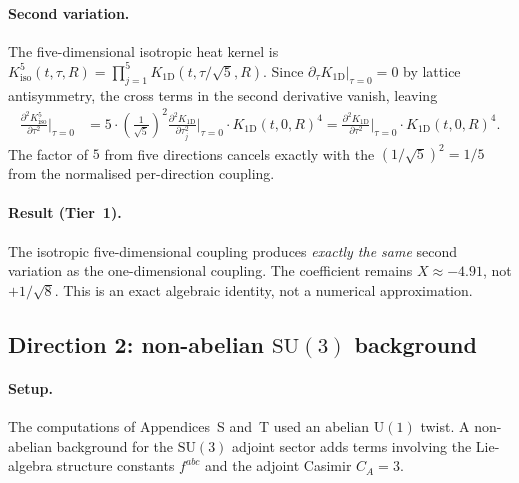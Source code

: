 \paragraph{Second variation.}
The five-dimensional isotropic heat kernel is
$K^{5}_{\mathrm{iso}}(t,\tau,R)
= \prod_{j=1}^5 K_{1\mathrm{D}}(t,\tau/\sqrt{5},R)$.
Since $\partial_\tau K_{1\mathrm{D}}|_{\tau=0}=0$ by lattice
antisymmetry, the cross terms in the second derivative vanish, leaving
\begin{align}
  \frac{\partial^2 K^5_{\mathrm{iso}}}{\partial\tau^2}\bigg|_{\tau=0}
    &= 5\cdot\left(\frac{1}{\sqrt{5}}\right)^2
       \frac{\partial^2 K_{1\mathrm{D}}}{\partial\tau_j^2}\bigg|_{\tau=0}
       \cdot K_{1\mathrm{D}}(t,0,R)^4
     = \frac{\partial^2 K_{1\mathrm{D}}}{\partial\tau^2}\bigg|_{\tau=0}
       \cdot K_{1\mathrm{D}}(t,0,R)^4.
\end{align}
The factor of $5$ from five directions cancels exactly with the
$(1/\sqrt{5})^2=1/5$ from the normalised per-direction coupling.

\paragraph{Result (Tier~1).}
The isotropic five-dimensional coupling produces \emph{exactly the
same} second variation as the one-dimensional coupling.  The
coefficient remains $X\approx -4.91$, not $+1/\sqrt{8}$.  This is an
exact algebraic identity, not a numerical approximation.

\subsection{Direction 2: non-abelian $\mathrm{SU}(3)$ background}
\label{ssec:D2}

\paragraph{Setup.}
The computations of Appendices~S and~T used an abelian $\mathrm{U}(1)$
twist.  A non-abelian background for the $\mathrm{SU}(3)$ adjoint sector
adds terms involving the Lie-algebra structure constants $f^{abc}$ and
the adjoint Casimir $C_A=3$.

